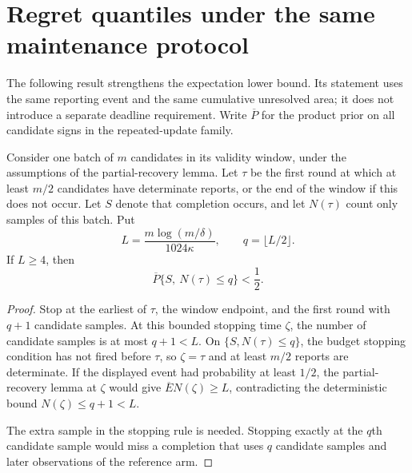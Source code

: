 \section{Regret quantiles under the same maintenance protocol}
\label{sec:quantile_extension}

The following result strengthens the expectation lower bound. Its statement
uses the same reporting event and the same cumulative unresolved area; it does
not introduce a separate deadline requirement. Write $\overline P$ for the
product prior on all candidate signs in the repeated-update family.

\begin{lemma}
\label{lem:budget_completion}
Consider one batch of $m$ candidates in its validity window, under the
assumptions of the partial-recovery lemma. Let $\tau$ be the first round at
which at least $m/2$ candidates have determinate reports, or the end of the
window if this does not occur. Let $S$ denote that completion occurs, and let
$N(\tau)$ count only samples of this batch. Put
\[
 L=\frac{m\log(m/\delta)}{1024\kappa},\qquad
 q=\lfloor L/2\rfloor.
\]
If $L\ge4$, then
\[
 \overline P\{S,\ N(\tau)\le q\}<\frac12.
\]
\end{lemma}
\begin{proof}
Stop at the earliest of $\tau$, the window endpoint, and the first round with
$q+1$ candidate samples. At this bounded stopping time $\zeta$, the number of
candidate samples is at most $q+1<L$. On $\{S,N(\tau)\le q\}$, the budget
stopping condition has not fired before $\tau$, so $\zeta=\tau$ and at least
$m/2$ reports are determinate. If the displayed event had probability at least
$1/2$, the partial-recovery lemma at $\zeta$ would give
$\overline E N(\zeta)\ge L$, contradicting the deterministic bound
$N(\zeta)\le q+1<L$.

The extra sample in the stopping rule is needed. Stopping exactly at the
$q$th candidate sample would miss a completion that uses $q$ candidate
samples and later observations of the reference arm.
\end{proof}

